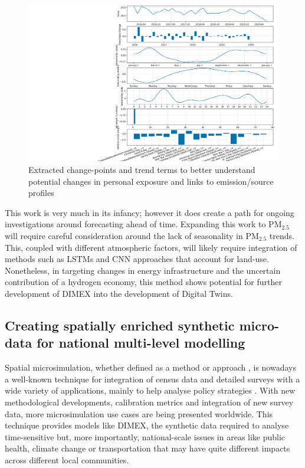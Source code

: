 \documentclass{article}
\begin{document}
\begin{figure}[htbp]
	\centering
	\includegraphics[width=0.95\linewidth]{Figures/components.png}		
	\caption{Extracted change-points and trend terms to better understand potential changes in personal exposure and links to emission/source profiles} \label{fig::changepoints}
\end{figure}

\noindent This work is very much in its infancy; however it does create a path for ongoing investigations around forecasting ahead of time. Expanding this work to PM$_{2.5}$ will require careful consideration around the lack of seasonality in PM$_{2.5}$ trends. This, coupled with different atmospheric factors, will likely require integration of methods such as LSTMs and CNN approaches that account for land-use. Nonetheless, in targeting changes in energy infrastructure and the uncertain contribution of a hydrogen economy, this method shows potential for further development of DIMEX into the development of Digital Twins.

\clearpage
\subsection{Creating spatially enriched synthetic micro-data for national multi-level modelling}


Spatial microsimulation, whether defined as a method or approach \citep{LovelaceR.Dumont2016}, is nowadays a well-known technique for integration of census data and detailed surveys with a wide variety of applications, mainly to help analyse policy strategies \citep{Hermes2012,Tanton2013,tanton2018spatial,Spiekermann2018}. With new methodological developments, calibration metrics and integration of new survey data, more microsimulation use cases are being presented worldwide. This technique provides models like DIMEX, the synthetic data required to analyse time-sensitive but, more importantly, national-scale issues in areas like public health, climate change or transportation that may have quite different impacts across different local communities.\\
\end{document}
